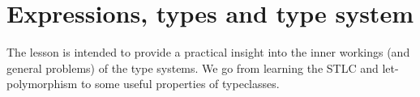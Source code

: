 \section{Expressions, types and type system}

The lesson is intended to provide a practical insight into the inner workings
(and general problems) of the type systems. We go from learning the STLC and
let-polymorphism to some useful properties of typeclasses.
